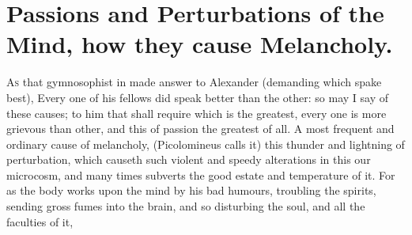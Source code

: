 \section{Passions and Perturbations of the Mind, how they cause Melancholy.}

\lettrine{A}{s} that gymnosophist in \Plutarch{} made answer
to Alexander (demanding which spake best), Every one of his fellows did speak
better than the other: so may I say of these causes; to him that shall require
which is the greatest, every one is more grievous than other, and this of
passion the greatest of all. A most frequent and ordinary cause of melancholy,
 (Picolomineus calls it) this
thunder and lightning of perturbation, which causeth such violent and speedy
alterations in this our microcosm, and many times subverts the good estate and
temperature of it. For as the body works upon the mind by his bad humours,
troubling the spirits, sending gross fumes into the brain, and so  disturbing the soul, and all the faculties of it,

